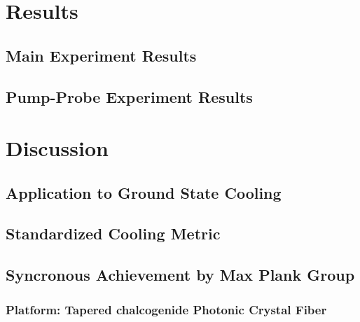 \section{Results}

  \subsection{Main Experiment Results}

  \subsection{Pump-Probe Experiment Results}

\section{Discussion}

  \subsection{Application to Ground State Cooling}

  \subsection{Standardized Cooling Metric}

  \subsection{Syncronous Achievement by Max Plank Group}

    \subsubsection{Platform: Tapered chalcogenide Photonic Crystal Fiber}
